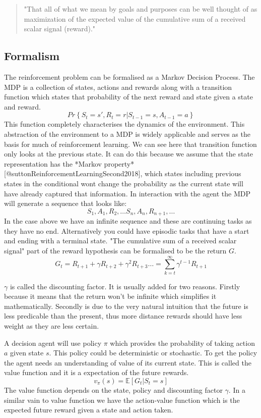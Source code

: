 \begin{quote}
    "That all of what we mean by goals and purposes can be well thought of as maximization of the expected value of the cumulative sum of a received scalar signal (reward)." 
    \cite{suttonReinforcementLearningSecond2018}
\end{quote}

\subsection{Formalism}

The reinforcement problem can be formalised as a Markov Decision Process. The MDP is a collection of states, actions and rewards along with a transition function which states that probability of the next reward and state given a state and reward.
$$
Pr\left\{ S_{t}=s', R_{t}=r | S_{t-1}=s, A_{t-1}=a \right\} 
$$
This function completely characterises the dynamics of the environment. This abstraction of the environment to a MDP is widely applicable and serves as the basis for much of reinforcement learning.  We can see here that transition function only looks at the previous state. It can do this because we assume that the state representation has the *Markov property* [@suttonReinforcementLearningSecond2018], which states including previous states in the conditional wont change the probability as the current state will have already captured that information. In interaction with the agent the MDP will generate a sequence that looks like:
$$S_{1},A_{1},R_{2},\dots S_{n},A_{n}, R_{n+1},\dots$$
In the case above we have an infinite sequence and these are continuing tasks as they have no end. Alternatively you could have episodic tasks that have a start and ending with a terminal state.
"The cumulative sum of a received scalar signal" part of the reward hypothesis can be formalised to be the return $G$.
$$
G_{t}=R_{t+1}+\gamma R_{t+2}+\gamma^{2}R_{t+3}\dots=\sum_{k=t}^{\infty}\gamma^{t-1}R_{t+1}
$$

$\gamma$ is called the discounting factor. It is usually added for two reasons. Firstly because it means that the return won't be infinite which simplifies it mathematically. Secondly is due to the very natural intuition that the future is less predicable than the present, thus more distance rewards should have less weight as they are less certain. 


A decision agent will use policy $\pi$ which provides the probability of taking action $a$ given state $s$. This policy could be deterministic or stochastic.
To get the policy the agent needs an understanding of value of its current state. This is called the value function and it is a expectation of the future rewards.
$$
v_{\pi}(s)=\mathbb{E}\left[ G_{t}| S_{t}=s\right] 
$$
The value function depends on the state, policy and discounting factor $\gamma$. In a similar vain to value function we have the action-value function which is the expected future reward given a state and action taken.

